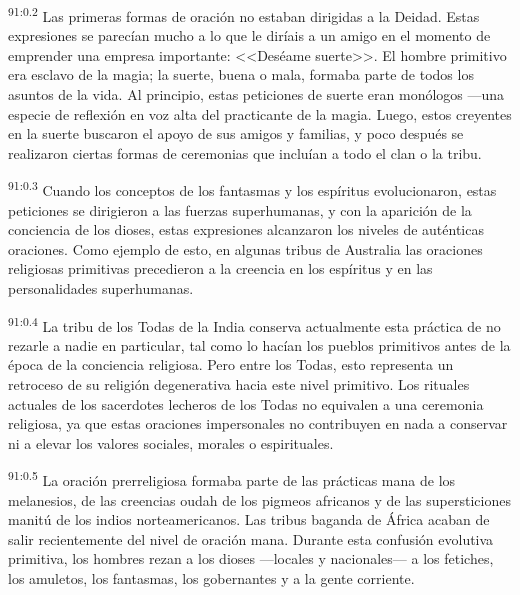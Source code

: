 \documentclass[twoside, 11pt]{book}
\begin{document}
\par
\textsuperscript{91:0.2} Las primeras formas de oración no estaban dirigidas a la Deidad. Estas expresiones se parecían mucho a lo que le diríais a un amigo en el momento de emprender una empresa importante: <<Deséame suerte>>. El hombre primitivo era esclavo de la magia; la suerte, buena o mala, formaba parte de todos los asuntos de la vida. Al principio, estas peticiones de suerte eran monólogos ---una especie de reflexión en voz alta del practicante de la magia. Luego, estos creyentes en la suerte buscaron el apoyo de sus amigos y familias, y poco después se realizaron ciertas formas de ceremonias que incluían a todo el clan o la tribu.

\par
\textsuperscript{91:0.3} Cuando los conceptos de los fantasmas y los espíritus evolucionaron, estas peticiones se dirigieron a las fuerzas superhumanas, y con la aparición de la conciencia de los dioses, estas expresiones alcanzaron los niveles de auténticas oraciones. Como ejemplo de esto, en algunas tribus de Australia las oraciones religiosas primitivas precedieron a la creencia en los espíritus y en las personalidades superhumanas.

\par
\textsuperscript{91:0.4} La tribu de los Todas de la India conserva actualmente esta práctica de no rezarle a nadie en particular, tal como lo hacían los pueblos primitivos antes de la época de la conciencia religiosa. Pero entre los Todas, esto representa un retroceso de su religión degenerativa hacia este nivel primitivo. Los rituales actuales de los sacerdotes lecheros de los Todas no equivalen a una ceremonia religiosa, ya que estas oraciones impersonales no contribuyen en nada a conservar ni a elevar los valores sociales, morales o espirituales.

\par
\textsuperscript{91:0.5} La oración prerreligiosa formaba parte de las prácticas mana de los melanesios, de las creencias oudah de los pigmeos africanos y de las supersticiones manitú de los indios norteamericanos. Las tribus baganda de África acaban de salir recientemente del nivel de oración mana. Durante esta confusión evolutiva primitiva, los hombres rezan a los dioses ---locales y nacionales--- a los fetiches, los amuletos, los fantasmas, los gobernantes y a la gente corriente.
\end{document}

